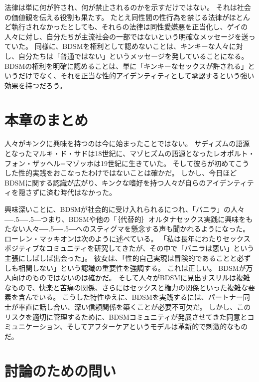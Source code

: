 \documentclass[paper=a4,book,openany]{jlreq}
\newcommand{\ig}[1]{}           %
\def\DDASH{―\kern-.5\zw―\kern-.5\zw―} %
\begin{document}
法律は単に何が許され、何が禁止されるのかを示すだけではない。
それは社会の価値観を伝える役割も果たす。
たとえ同性間の性行為を禁じる法律がほとんど執行されなかったとしても、それらの法律は同性愛嫌悪を正当化し、ゲイの人々に対し、自分たちが主流社会の一部ではないという明確なメッセージを送っていた。
同様に、BDSMを権利として認めないことは、キンキーな人々に対し、自分たちは「普通ではない」というメッセージを発していることになる。
BDSMの権利を明確に認めることは、単に「キンキーなセックスが許される」というだけでなく、それを正当な性的アイデンティティとして承認するという強い効果を持つだろう。

\section{本章のまとめ}

人々がキンクに興味を持つのは今に始まったことではない。
サディズムの語源となったマルキ・ド・サドは18世紀に、マゾヒズムの語源となったレオポルト・フォン・ザッヘル=マゾッホは19世紀に生きていた。
そして彼らが初めてこうした性的実践をおこなったわけではないことは確かだ。
しかし、今日ほどBDSMに関する認識が広がり、キンクな嗜好を持つ人々が自らのアイデンティティを隠さずに済む時代はなかった。

興味深いことに、BDSMが社会的に受け入れられるにつれ、「バニラ」の人々{\DDASH}つまり、BDSMや他の「｛代替的｝{オルタナ}セックス実践に興味をもたない人々{\DDASH}へのスティグマを懸念する声も聞かれるようになった。
ローレン・マッキオン\ig{(Lauren McKeon)}は次のように述べている。
「私は長年にわたりセックスポジティブなコミュニティを研究してきたが、その中で「バニラは悪い」という主張にしばしば出会った」。
彼女は、「性的自己実現は冒険的であることと必ずしも相関しない」という認識の重要性を強調する\citep{mckeon17:_when_it_comes}。
これは正しい。
BDSMが万人向けのものではないのは確かだ。
そして人々がBDSMに見出すスリルは複雑なもので、快楽と苦痛の関係、さらにはセックスと権力の関係といった複雑な要素を含んでいる。
こうした特性ゆえに、BDSMを実践するには、パートナー同士が率直に話し合い、深い信頼関係を築くことが必要不可欠だ。
しかし、このリスクを適切に管理するために、BDSMコミュニティが発展させてきた同意とコミュニケーション、そしてアフターケアというモデルは革新的で刺激的なものだ。

\section{討論のための問い}
\end{document}
